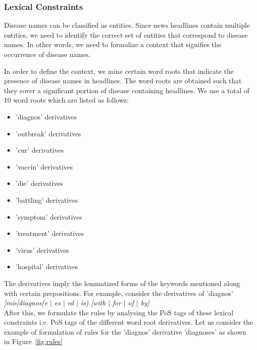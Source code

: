 \documentclass{article}
\begin{document}
\subsubsection{Lexical Constraints}

Disease names can be classified as entities. Since news headlines contain multiple entities, we need to identify the correct set of entities that correspond to disease names. In other words, we need to formalize a context that signifies the occurrence of disease names. 

In order to define the context, we mine certain word roots that indicate the presence of disease names in headlines. The word roots are obtained such that they cover a significant portion of disease containing headlines. We use a total of 10 word roots which are listed as follows: 

\begin{itemize}
\item 'diagnos' derivatives

\item 'outbreak' derivatives

\item 'cur' derivatives

\item 'vaccin' derivatives

\item 'die' derivatives

\item 'battling' derivatives

\item 'symptom' derivatives

\item 'treatment' derivatives

\item 'virus' derivatives

\item 'hospital' derivatives

\end{itemize}
The derivatives imply the lemmatized forms of the keywords mentioned along with
certain prepositions. For example, consider the derivatives of 'diagnos'\\

\textit{[mis]diagnos(e  $|$ es $|$ ed $|$ is) [with $|$ for $|$ of  $|$ by]}\\ 

After this, we formulate the rules by analysing the PoS tags of these lexical constraints i.e. PoS tags of the
different word root derivatives. Let us consider the example of formulation of rules for the
'diagnos' derivative 'diagnoses' as shown in Figure~\ref{fig:rules}
\end{document}
